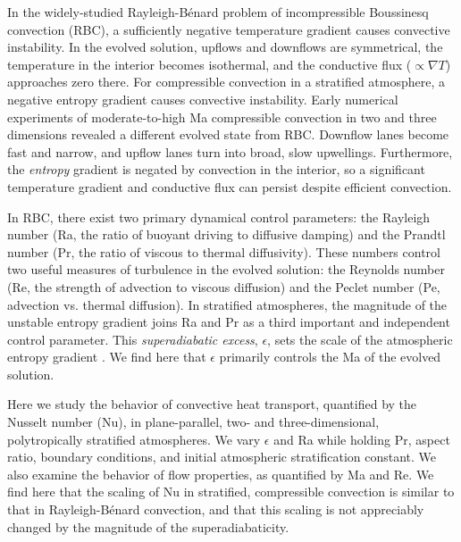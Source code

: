 \documentclass[aps, prfluids, onecolumn, notitlepage, nofootinbib, groupedaddress, amsfonts, amssymb, amsmath]{revtex4-1}
\newcommand{\grad}{\ensuremath{\nabla}}
\newcommand{\RB}{Rayleigh-B\'{e}nard }
\begin{document}
In the widely-studied \RB problem of incompressible Boussinesq convection (RBC), 
a sufficiently negative temperature gradient causes convective instability.
In the evolved solution, upflows and downflows are symmetrical, the
temperature in the interior becomes isothermal, and
the conductive flux ($\propto \grad T$) approaches 
zero there. 
For compressible convection in a stratified atmosphere, a
negative entropy gradient causes convective instability.
Early numerical experiments of moderate-to-high Ma compressible convection
in two \cite{graham1975, chan&all1982,
hurlburt&all1984, cattaneo&all1990} and three 
\cite{cattaneo&all1991, brandenburg&all2005, brummell&all1996} dimensions
revealed a different evolved state from RBC.
Downflow lanes
become fast and narrow, and upflow lanes turn into broad, slow upwellings.
Furthermore, the \emph{entropy} gradient is negated by convection in the interior, so
a significant temperature gradient and conductive flux can persist despite
efficient convection.

In RBC, there exist two primary dynamical control parameters: 
the Rayleigh number (Ra, the ratio of
buoyant driving to diffusive damping) and the Prandtl number 
(Pr, the ratio of viscous to thermal
diffusivity). These numbers control two useful
measures of turbulence in the evolved solution:
the Reynolds
number (Re, the strength of advection to viscous diffusion)
and the Peclet number (Pe, advection vs. thermal diffusion).  
In stratified atmospheres, the magnitude of the unstable entropy gradient
joins Ra and Pr as a third important and independent control parameter.  This 
\emph{superadiabatic excess}, $\epsilon$,
sets the scale of the atmospheric entropy gradient \cite{graham1975}.
We find here that $\epsilon$ primarily controls the Ma of the evolved solution.

Here we study the behavior of convective heat transport, 
quantified by the Nusselt number (Nu), in plane-parallel, 
two- and three-dimensional, polytropically stratified atmospheres.  
We vary $\epsilon$ and Ra while holding Pr, aspect ratio, boundary conditions,
and initial atmospheric stratification
constant.  We also examine the behavior of flow properties, as quantified by Ma and Re.
We find here that the scaling of Nu in stratified, compressible convection 
is similar to that in \RB convection,
and that this scaling is not appreciably changed by the magnitude of the superadiabaticity.
\end{document}
